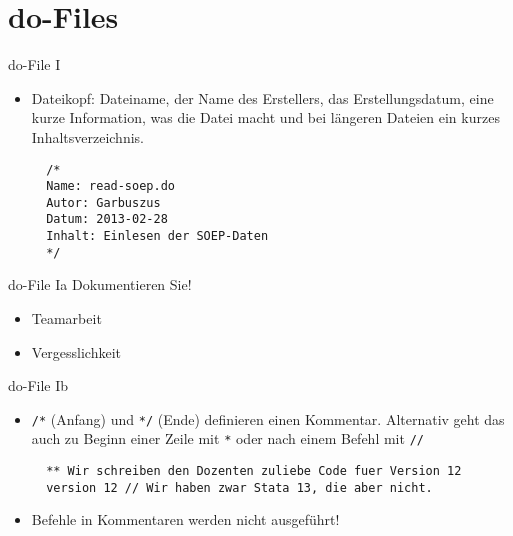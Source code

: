 \section{do-Files}
\begin{frame}[fragile]{do-File I}
  \begin{itemize}
  \item Dateikopf: Dateiname, der Name des Erstellers, das Erstellungsdatum, eine kurze Information, was die Datei macht und bei längeren Dateien ein kurzes Inhaltsverzeichnis. 
    
  \begin{lstlisting}
  /*
  Name: read-soep.do
  Autor: Garbuszus
  Datum: 2013-02-28
  Inhalt: Einlesen der SOEP-Daten
  */
  \end{lstlisting}
  \end{itemize}
\end{frame}

\begin{frame}{do-File Ia}
Dokumentieren Sie! 
\begin{itemize}
\item Teamarbeit
\item Vergesslichkeit
\end{itemize}

  

\end{frame}


\begin{frame}[fragile]{do-File Ib}
\begin{itemize} 
   \item \texttt{/*} (Anfang) und \texttt{*/} (Ende) definieren einen Kommentar. Alternativ geht das auch zu Beginn einer Zeile mit \texttt{*} oder nach einem Befehl mit \texttt{//}
  
  \begin{lstlisting}
  ** Wir schreiben den Dozenten zuliebe Code fuer Version 12
  version 12 // Wir haben zwar Stata 13, die aber nicht.
  \end{lstlisting}
  \item Befehle in Kommentaren werden nicht ausgeführt!
  \end{itemize}
\end{frame}

